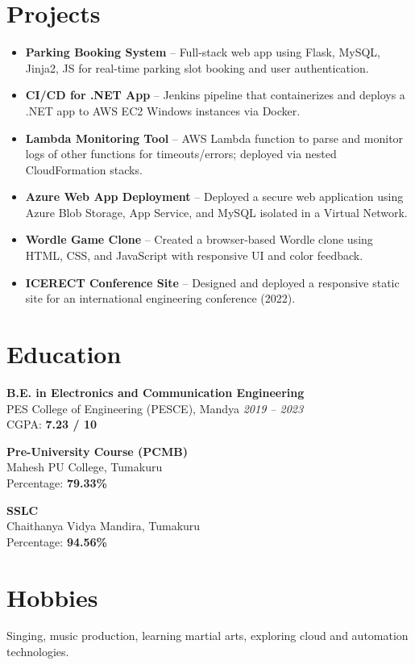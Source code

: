 \documentclass[a4paper,10pt]{article}
\begin{document}
\section*{Projects}
\begin{itemize}
    \item \textbf{Parking Booking System} – Full-stack web app using Flask, MySQL, Jinja2, JS for real-time parking slot booking and user authentication.
    \item \textbf{CI/CD for .NET App} – Jenkins pipeline that containerizes and deploys a .NET app to AWS EC2 Windows instances via Docker.
    \item \textbf{Lambda Monitoring Tool} – AWS Lambda function to parse and monitor logs of other functions for timeouts/errors; deployed via nested CloudFormation stacks.
    \item \textbf{Azure Web App Deployment} – Deployed a secure web application using Azure Blob Storage, App Service, and MySQL isolated in a Virtual Network.
    \item \textbf{Wordle Game Clone} – Created a browser-based Wordle clone using HTML, CSS, and JavaScript with responsive UI and color feedback.
    \item \textbf{ICERECT Conference Site} – Designed and deployed a responsive static site for an international engineering conference (2022).
\end{itemize}

\section*{Education}
\textbf{B.E. in Electronics and Communication Engineering} \\
PES College of Engineering (PESCE), Mandya \hfill \textit{2019 – 2023} \\
CGPA: \textbf{7.23 / 10}

\vspace{4pt}
\textbf{Pre-University Course (PCMB)} \\
Mahesh PU College, Tumakuru \\
Percentage: \textbf{79.33\%}

\vspace{4pt}
\textbf{SSLC} \\
Chaithanya Vidya Mandira, Tumakuru \\
Percentage: \textbf{94.56\%}

\section*{Hobbies}
Singing, music production, learning martial arts, exploring cloud and automation technologies.
\end{document}
